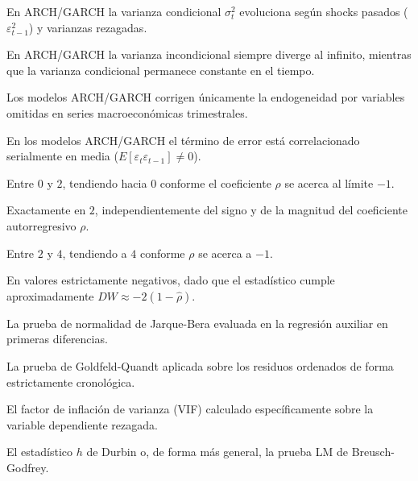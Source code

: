 \begin{opts}
    \item En ARCH/GARCH la varianza condicional $\sigma_t^2$ evoluciona según shocks pasados ($\varepsilon_{t-1}^2$) y varianzas rezagadas.
    \item En ARCH/GARCH la varianza incondicional siempre diverge al infinito, mientras que la varianza condicional permanece constante en el tiempo.
    \item Los modelos ARCH/GARCH corrigen únicamente la endogeneidad por variables omitidas en series macroeconómicas trimestrales.
    \item En los modelos ARCH/GARCH el término de error está correlacionado serialmente en media ($E[\varepsilon_t \varepsilon_{t-1}] \neq 0$).
\end{opts}

\begin{opts}
    \item Entre $0$ y $2$, tendiendo hacia $0$ conforme el coeficiente $\rho$ se acerca al límite $-1$.
    \item Exactamente en $2$, independientemente del signo y de la magnitud del coeficiente autorregresivo $\rho$.
    \item Entre $2$ y $4$, tendiendo a $4$ conforme $\rho$ se acerca a $-1$.
    \item En valores estrictamente negativos, dado que el estadístico cumple aproximadamente $DW \approx -2(1 - \hat{\rho})$.
\end{opts}

\begin{opts}
    \item La prueba de normalidad de Jarque-Bera evaluada en la regresión auxiliar en primeras diferencias.
    \item La prueba de Goldfeld-Quandt aplicada sobre los residuos ordenados de forma estrictamente cronológica.
    \item El factor de inflación de varianza (VIF) calculado específicamente sobre la variable dependiente rezagada.
    \item El estadístico $h$ de Durbin o, de forma más general, la prueba LM de Breusch-Godfrey.
\end{opts}

